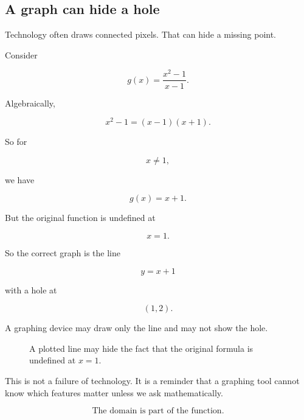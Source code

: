 \subsection{A graph can hide a hole}
\label{appsubsec:graph-can-hide-hole}

Technology often draws connected pixels.  That can hide a missing point.

Consider

\[
g(x)=\frac{x^2-1}{x-1}.
\]

Algebraically,

\[
x^2-1=(x-1)(x+1).
\]

So for

\[
x\neq1,
\]

we have

\[
g(x)=x+1.
\]

But the original function is undefined at

\[
x=1.
\]

So the correct graph is the line

\[
y=x+1
\]

with a hole at

\[
(1,2).
\]

A graphing device may draw only the line and may not show the hole.

\begin{figure}[h]
\centering
{}
\caption{A plotted line may hide the fact that the original formula is undefined at \(x=1\).}
\label{fig:technology-hidden-hole}
\end{figure}

This is not a failure of technology.  It is a reminder that a graphing tool cannot know
which features matter unless we ask mathematically.

\[
\boxed{
\text{The domain is part of the function.}
}
\]

